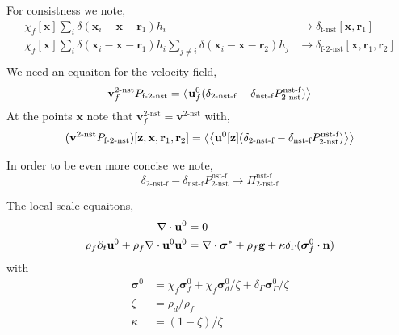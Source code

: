 For consistness we note, 
\begin{align}
    \chi_f[\textbf{x}] \sum_i \delta(\textbf{x}_i-\textbf{x}-\textbf{r}_1)h_i
    &\to 
    \delta_\text{f-nst}[\textbf{x},\textbf{r}_1]\\
    \chi_f[\textbf{x}] 
    \sum_i \delta(\textbf{x}_i-\textbf{x}-\textbf{r}_1)h_i
    \sum_{j\neq i} \delta(\textbf{x}_i-\textbf{x}-\textbf{r}_2)h_j
    &\to 
    \delta_\text{f-2-nst}[\textbf{x},\textbf{r}_1,\textbf{r}_2]\\
\end{align}
We need an equaiton for the velocity field, 
\begin{equation}
    \textbf{v}_f^\text{2-nst}P_\text{f-2-nst}
    =
    \left<
        \textbf{u}_f^0 
        (\delta_\text{2-nst-f} - \delta_\text{nst-f} P^\text{nst-f}_\text{2-nst})
    \right>
\end{equation}
At the points $\textbf{x}$ note that $\textbf{v}_f^\text{2-nst} = \textbf{v}^\text{2-nst}$ with,
\begin{equation}
    (\textbf{v}^\text{2-nst}P_\text{f-2-nst})[\textbf{z},\textbf{x},\textbf{r}_1,\textbf{r}_2]
    =
    \left<
        \left<
            \textbf{u}^0[\textbf{z}]
            (\delta_\text{2-nst-f} - \delta_\text{nst-f} P^\text{nst-f}_\text{2-nst})
        \right>
    \right>
\end{equation}

In order to be even more concise we note,
\begin{equation}
    \delta_\text{2-nst-f} - \delta_\text{nst-f} P^\text{nst-f}_\text{2-nst}
    \to 
    \Pi_\text{2-nst-f}^\text{nst-f}
\end{equation}


The local scale equaitons, 
\begin{align}
    \mathbf{\nabla}\cdot \textbf{u}^0  &= 0 \\
    \rho_f \partial_t \textbf{u}^0
    + \rho_f \mathbf{\nabla}\cdot \textbf{u}^0\textbf{u}^0
    &= 
    \mathbf{\nabla}\cdot \bm\sigma^* 
    + \rho_f \textbf{g}
    + \kappa \delta_\Gamma(\bm\sigma_f^0 \cdot \textbf{n})
\end{align}
with 
\begin{align}
    \bm\sigma^0 
    &= \chi_f \bm\sigma_f^0
    + \chi_f \bm\sigma_d^0/\zeta
    + \delta_\Gamma \bm\sigma_\Gamma^0/\zeta\\
    \zeta
    &= \rho_d / \rho_f\\
    \kappa
    &= (1-\zeta)/\zeta\\
\end{align}

